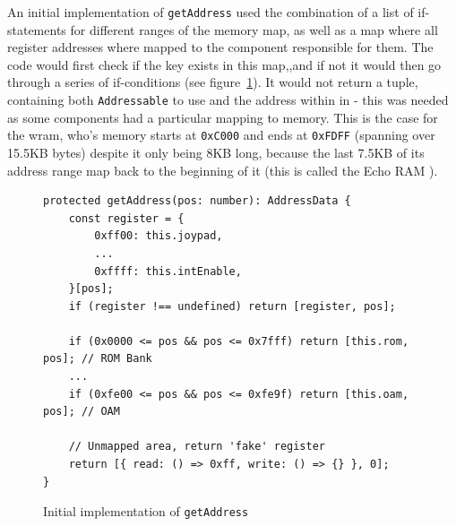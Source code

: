 \documentclass[11pt]{informatics-report}
\begin{document}
An initial implementation of \texttt{getAddress} used the combination of a list of if-statements for different ranges of the memory map, as well as a map where all register addresses where mapped to the component responsible for them. The code would first check if the key exists in this map,,and if not it would then go through a series of if-conditions  (see figure~\ref{fig:getaddress-before}). It would not return a tuple, containing both \texttt{Addressable} to use and the address within in - this was needed as some components had a particular mapping to memory. This is the case for the \gls{wram}, who's memory starts at \texttt{0xC000} and ends at \texttt{0xFDFF} (spanning over 15.5KB bytes) despite it only being 8KB long, because the last 7.5KB of its address range map back to the beginning of it (this is called the Echo RAM \cite{memorymap}).

\begin{figure}[h]
    \begin{verbatim}
protected getAddress(pos: number): AddressData {
    const register = {
        0xff00: this.joypad,
        ...
        0xffff: this.intEnable,
    }[pos];
    if (register !== undefined) return [register, pos];

    if (0x0000 <= pos && pos <= 0x7fff) return [this.rom, pos]; // ROM Bank
    ...
    if (0xfe00 <= pos && pos <= 0xfe9f) return [this.oam, pos]; // OAM

    // Unmapped area, return 'fake' register
    return [{ read: () => 0xff, write: () => {} }, 0];
}
    \end{verbatim}
    \caption{Initial implementation of \texttt{getAddress}}
    \label{fig:getaddress-before}
\end{figure}
\end{document}
